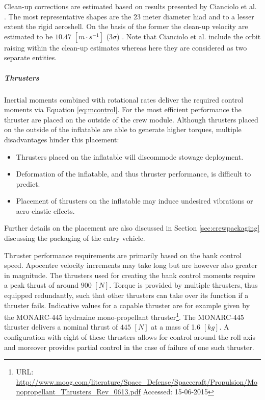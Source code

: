 Clean-up corrections are estimated based on results presented by Cianciolo et al. \cite{Cianciolo2010}. The most representative shapes are the $23$ meter diameter \gls{hiad} and to a lesser extent the rigid aeroshell. On the basis of the former the clean-up velocity are estimated to be $10.47$ $[m\cdot s^{-1}]$ ($3\sigma$) \cite[p.37]{Cianciolo2010}. Note that Cianciolo et al. include the orbit raising within the clean-up estimates whereas here they are considered as two separate entities.

\subparagraph{Thrusters}
Inertial moments combined with rotational rates deliver the required control moments via Equation \ref{eq:mcontrol}. For the most efficient performance the thruster are placed on the outside of the crew module. Although thrusters placed on the outside of the inflatable are able to generate higher torques, multiple disadvantages hinder this placement:
\begin{itemize}
\item Thrusters placed on the inflatable will discommode stowage deployment.
\item Deformation of the inflatable, and thus thruster performance, is difficult to predict.
\item Placement of thrusters on the inflatable may induce undesired vibrations or aero-elastic effects.  
\end{itemize} 

Further details on the placement are also discussed in Section \ref{sec:crewpackaging} discussing the packaging of the entry vehicle.

Thruster performance requirements are primarily based on the bank control speed. Apocentre velocity increments may take long but are however also greater in magnitude. The thrusters used for creating the bank control moments require a peak thrust of around $900$ $[N]$. Torque is provided by multiple thrusters, thus equipped redundantly, such that other thrusters can take over its function if a thruster fails.
Indicative values for a capable thruster are for example given by the  MONARC-445 hydrazine mono-propellant thruster\footnote{URL: \url{http://www.moog.com/literature/Space\_Defense/Spacecraft/Propulsion/Monopropellant\_Thrusters\_Rev\_0613.pdf} Accessed: 15-06-2015}. The MONARC-445 thruster delivers a nominal thrust of $445$ $[N]$ at a mass of 1.6 $[kg]$.  A configuration with eight of these thrusters allows for control around the roll axis and moreover provides partial control in the case of failure of one such thruster.
 
